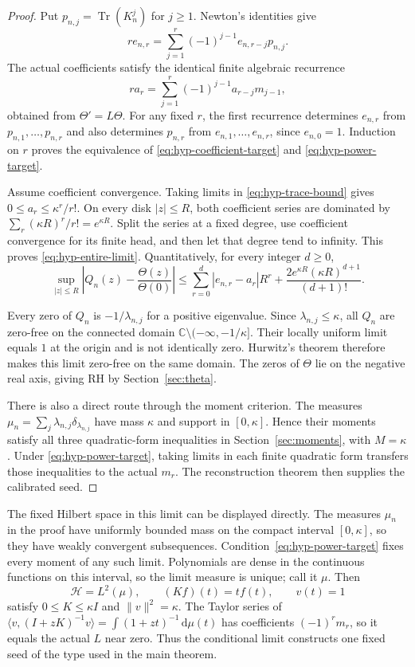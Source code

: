 \documentclass[11pt,a4paper]{article}
\numberwithin{equation}{section}
\theoremstyle{definition}
\theoremstyle{remark}
\newcommand{\C}{\mathbb C}
\newcommand{\HH}{\mathcal H}
\newcommand{\ip}[2]{\langle #1,#2\rangle}
\newcommand{\norm}[1]{\lVert #1\rVert}
\newcommand{\dd}{\,\mathrm d}
\DeclareMathOperator{\Tr}{Tr}
\begin{document}
\begin{proof}
Put $p_{n,j}=\Tr(K_n^j)$ for $j\geq1$. Newton's identities give
\[
r e_{n,r}=\sum_{j=1}^r(-1)^{j-1}e_{n,r-j}p_{n,j}.
\]
The actual coefficients satisfy the identical finite algebraic
recurrence
\[
r a_r=\sum_{j=1}^r(-1)^{j-1}a_{r-j}m_{j-1},
\]
obtained from $\Theta'=L\Theta$. For any fixed $r$, the first
recurrence determines $e_{n,r}$ from $p_{n,1},\ldots,p_{n,r}$ and
also determines $p_{n,r}$ from $e_{n,1},\ldots,e_{n,r}$, since
$e_{n,0}=1$. Induction on $r$ proves the equivalence of
\eqref{eq:hyp-coefficient-target} and \eqref{eq:hyp-power-target}.

Assume coefficient convergence. Taking limits in
\eqref{eq:hyp-trace-bound} gives $0\leq a_r\leq\kappa^r/r!$.
On every disk $|z|\leq R$, both coefficient series are dominated by
$\sum_r(\kappa R)^r/r!=e^{\kappa R}$. Split the series at a fixed
degree, use coefficient convergence for its finite head, and then
let that degree tend to infinity. This proves
\eqref{eq:hyp-entire-limit}. Quantitatively, for every integer $d\geq0$,
\begin{equation}\label{eq:hyp-uniform-tail}
\sup_{|z|\leq R}\left|Q_n(z)-\frac{\Theta(z)}{\Theta(0)}\right|
\leq\sum_{r=0}^{d}|e_{n,r}-a_r|R^r
 +\frac{2e^{\kappa R}(\kappa R)^{d+1}}{(d+1)!}.
\end{equation}

Every zero of $Q_n$ is $-1/\lambda_{n,j}$ for a positive eigenvalue.
Since $\lambda_{n,j}\leq\kappa$, all $Q_n$ are zero-free on the
connected domain $\C\setminus(-\infty,-1/\kappa]$. Their locally
uniform limit equals $1$ at the origin and is not identically zero.
Hurwitz's theorem therefore makes this limit zero-free on the same
domain. The zeros of $\Theta$ lie on the negative real axis, giving RH
by Section~\ref{sec:theta}.

There is also a direct route through the moment criterion. The measures
$\mu_n=\sum_j\lambda_{n,j}\delta_{\lambda_{n,j}}$ have mass $\kappa$
and support in $[0,\kappa]$. Hence their moments satisfy all three
quadratic-form inequalities in Section~\ref{sec:moments}, with
$M=\kappa$. Under \eqref{eq:hyp-power-target}, taking limits in
each finite quadratic form transfers those inequalities to the actual
$m_r$. The reconstruction theorem then supplies the calibrated seed.
\end{proof}

The fixed Hilbert space in this limit can be displayed directly.
The measures $\mu_n$ in the proof have uniformly bounded mass on
the compact interval $[0,\kappa]$, so they have weakly convergent
subsequences. Condition~\eqref{eq:hyp-power-target} fixes every
moment of any such limit. Polynomials are dense in the continuous
functions on this interval, so the limit measure is unique; call it
$\mu$. Then
\begin{equation}\label{eq:hyp-fixed-limit-seed}
\HH=L^2(\mu),\qquad (Kf)(t)=tf(t),\qquad v(t)=1
\end{equation}
satisfy $0\leq K\leq\kappa I$ and $\norm v^2=\kappa$.
The Taylor series of
$\ip{v}{(I+zK)^{-1}v}=\int(1+zt)^{-1}\dd\mu(t)$
has coefficients $(-1)^rm_r$, so it equals the actual $L$ near
zero. Thus the conditional limit constructs one fixed seed of the
type used in the main theorem.
\end{document}
